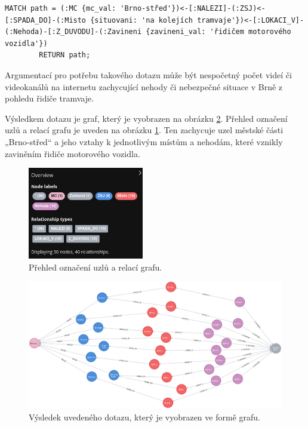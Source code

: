 \documentclass[a4paper, 11pt]{article}
\begin{document}
    \begin{lstlisting}[style=Cypher]
        MATCH path = (:MC {mc_val: 'Brno-střed'})<-[:NALEZI]-(:ZSJ)<-[:SPADA_DO]-(:Misto {situovani: 'na kolejích tramvaje'})<-[:LOKACI_V]-(:Nehoda)-[:Z_DUVODU]-(:Zavineni {zavineni_val: 'řidičem motorového vozidla'})
        RETURN path;
    \end{lstlisting}

    Argumentací pro potřebu takového dotazu může být nespočetný počet videí či videokanálů na internetu zachycující nehody či nebezpečné situace v Brně z pohledu řidiče tramvaje.

    Výsledkem dotazu je graf, který je vyobrazen na obrázku \ref{neo4j_query_result}. Přehled označení uzlů a relací grafu je uveden na obrázku \ref{overview}. Ten zachycuje uzel městské části „Brno-střed“ a jeho vztahy k jednotlivým místům a nehodám, které vznikly zaviněním řidiče motorového vozidla.

    \begin{figure}[ht!]
        \centering                
        \includegraphics[width=0.45\textwidth]{img/overview.png}
        \caption{Přehled označení uzlů a relací grafu\label{overview}.}
    \end{figure}

    \begin{landscape}      
        \hfill
        \begin{figure}[ht!]
        \centering                
        \includegraphics[width=1.5\textwidth]{img/graph.png}
        \caption{Výsledek uvedeného dotazu, který je vyobrazen ve formě grafu\label{neo4j_query_result}.}
        \end{figure}            
    \end{landscape}    
\end{document}
